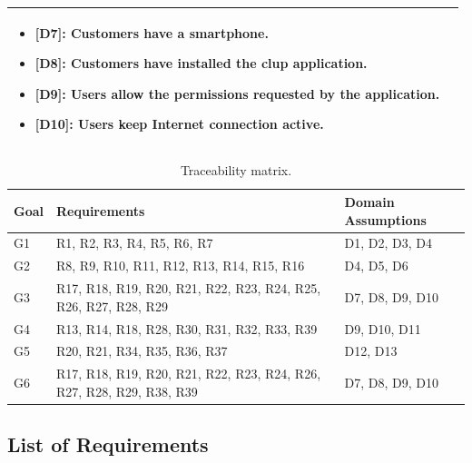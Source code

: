 \begin{table}[H]
\begin{tabular}{| m{} | m{} |}
		\begin{itemize}
			\item {\textbf{[D7]}}: Customers have a smartphone.
			\item {\textbf{[D8]}}: Customers have installed the \gls{clup} application.
			\item {\textbf{[D9]}}: Users allow the permissions requested by the application.
			\item {\textbf{[D10]}}: Users keep Internet connection active.
		\end{itemize} \\ 
	\hline
\end{tabular}
\end{table}

\begin{table}[H]
\centering
\begin{tabular}{| m{} | m{} | m{} |} 
	\hline
		\textbf{Goal} & \textbf{Requirements} & \textbf{Domain Assumptions} \\
		\hline
		G1 & R1, R2, R3, R4, R5, R6, R7 & D1, D2, D3, D4 \\
		\hline
		G2 & R8, R9, R10, R11, R12, R13, R14, R15, R16 & D4, D5, D6 \\
		\hline
		G3 & R17, R18, R19, R20, R21, R22, R23, R24, R25, R26, R27, R28, R29 & D7, D8, D9, D10 \\
		\hline
		G4 & R13, R14, R18, R28, R30, R31, R32, R33, R39 & D9, D10, D11 \\
		\hline
		G5 & R20, R21, R34, R35, R36, R37 & D12, D13 \\
		\hline
		G6 & R17, R18, R19, R20, R21, R22, R23, R24, R26, R27, R28, R29, R38, R39 & D7, D8, D9, D10 \\
	\hline
\end{tabular}
\caption{Traceability matrix.}
\end{table}

\subsection{List of Requirements}

